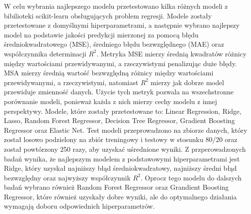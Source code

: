 \documentclass{article}
\begin{document}
\begin{multicols}{2}
W celu wybrania najlepszego modelu przetestowano kilka różnych modeli z bibilioteki scikit-learn obsługujących problem regresji. 
Modele zostały przetestowane z domyślnymi hiperparametrami, a następnie wybrano najlepszy model na 
podstawie jakości predykcji mierzonej za pomocą błędu średniokwadratowego (MSE),
średniego błędu bezwzględnego (MAE) oraz współczynnika determinacji $R^{2}$.
Metryka MSE mierzy średnią kwadratów różnicy między wartościami przewidywanymi, a rzeczywistymi penalizując duże błędy.
MSA mierzy średnią wartość bezwzględną różnicy między wartościami przewidywanymi, a rzeczywistymi, natomiast $R^{2}$ mierzy jak dobrze model przewiduje zmienność danych.
Użycie tych metryk pozwala na wszechstronne porównanie modeli, ponieważ każda z nich mierzy cechy modelu z innej perspektywy.
Modele, które zostały przetestowane to: Linear Regression, Ridge, Lasso, Random Forest Regressor, 
Decision Tree Regressor, Gradient Boosting Regressor oraz Elastic Net.
Test modeli przeprowadzono na zbiorze danych, który został losowo podzielony na zbiór 
treningowy i testowy w stosunku 80/20 oraz został powtórzony 250 razy, aby uzyskać uśrednione wyniki.
Z przperowadzonych badań wynika, że najlepszym modelem z podstawowymi hiperparametrami jest Ridge, który uzyskał najniższy błąd średniokwadratowy, 
najniższy średni błąd bezwzględny oraz najwyższy współczynnik $R^{2}$.
Oprocz tego modelu do dalszych badań wybrano również Random Forest Regressor oraz Grandient Boosting Regressor, 
które również uzyskały dobre wyniki, ale do optymalnego działania wymagają doboru odpowiednich hiperparametrów.
\begin{figure}[H]
    \label{fig:models_comparison}

\end{figure}
\end{multicols}
\end{document}
